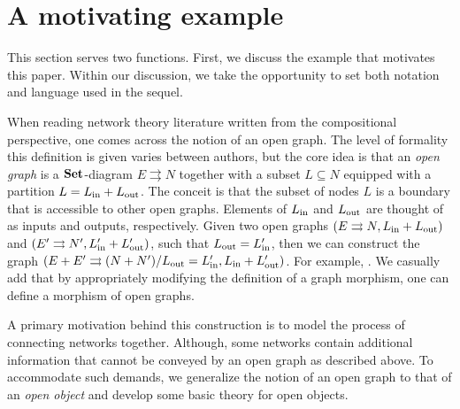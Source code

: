 \documentclass[master_reopn]{subfiles}
\begin{document}
\section{A motivating example} \label{sec_motivating-example}

This section serves two functions. First, we discuss the example that motivates this paper.  Within our discussion, we take the opportunity to set both notation and language used in the sequel.  

When reading network theory literature written from the compositional perspective, one comes across the notion of an open graph. 
The level of formality this definition is given varies between authors, but the core idea is that an \emph{open graph} is a $ \mathbf{Set} $-diagram $ E \rightrightarrows N $ together with a subset $ L \subseteq N$ equipped with a partition $ L = L_{ \text{in} } + L_{ \text{out} } $.
The conceit is that the subset of nodes $ L $ is a boundary that is accessible to other open graphs. Elements of $ L_{ \text{in} } $ and $ L_{ \text{out} } $ are thought of as inputs and outputs, respectively.  Given two open graphs $ (E \rightrightarrows N , L_{ \text{in} } + L_{ \text{out} }) $ and $ (E' \rightrightarrows N' , L'_{ \text{in} } + L'_{ \text{out} }) $, such that $ L_{ \text{out} } = L'_{ \text{in} } $, then we can construct the graph $ (E + E' \rightrightarrows (N + N') / L_{ \text{out} } = L'_{ \text{in} } ,  L_{ \text{in} } + L'_{ \text{out} } ) $.  For example,
	.
We casually add that by appropriately modifying the definition of a graph morphism, one can define a morphism of open graphs.

A primary motivation behind this construction is to model the process of connecting networks together.  Although, some networks contain additional information that cannot be conveyed by an open graph as described above.
To accommodate such demands, we generalize the notion of an open graph to that of an \emph{open object} and develop some basic theory for open objects.  
\end{document}
